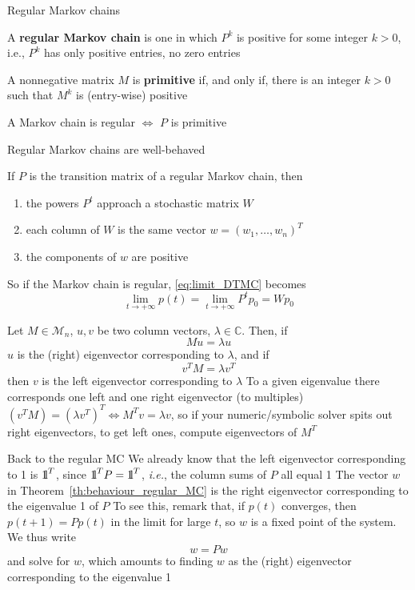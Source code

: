 \documentclass{beamer}
\def\IC{\mathbb{C}}
\def\M{\mathcal{M}}
\def\ie{\emph{i.e.}}
\def\defword#1{\textbf{#1}}
\def\nbOne{{\mathchoice {\rm 1\mskip-4mu l} {\rm 1\mskip-4mu l}
		{\rm 1\mskip-4.5mu l} {\rm 1\mskip-5mu l}}}
\begin{document}
\begin{frame}{Regular Markov chains}
\begin{definition}
A \defword{regular Markov chain} is one in which $P^k$ is positive for some integer $k>0$, i.e., $P^k$ has only positive entries, no zero entries
\end{definition}
\vfill
\begin{definition}
A nonnegative matrix $M$ is \defword{primitive} if, and only if, there is an integer $k>0$ such that $M^k$ is (entry-wise) positive
\end{definition}
\vfill
\begin{theorem}
A Markov chain is regular $\iff$ $P$ is primitive
\end{theorem}
\end{frame}

\begin{frame}{Regular Markov chains are well-behaved}
\begin{theorem}\label{th:behaviour_regular_MC}
If $P$ is the transition matrix of a regular Markov chain, then
\begin{enumerate}
\item the powers $P^t$ approach a stochastic matrix $W$
\item each column of $W$ is the same vector $w=(w_1,\ldots,w_n)^T$
\item the components of $w$ are positive
\end{enumerate}
\end{theorem}
\vfill
So if the Markov chain is regular, \eqref{eq:limit_DTMC} becomes
\[
\lim_{t\rightarrow +\infty}p(t)=\lim_{t\rightarrow +\infty}P^tp_0
=Wp_0
\]
\end{frame}

\begin{frame} 
Let $M\in\M_n$, $u,v$ be two column vectors, $\lambda\in\IC$. Then, if  
\[
Mu=\lambda u
\]
$u$ is the (right) eigenvector corresponding to $\lambda$, and if
\[
v^TM=\lambda v^T
\]
then $v$ is the left eigenvector corresponding to $\lambda$
\vfill 
To a given eigenvalue there corresponds one left and one right eigenvector (to multiples)
\vfill
$(v^TM)=(\lambda v^T)^T\iff M^Tv=\lambda v$, so if your numeric/symbolic solver spits out right eigenvectors, to get left ones, compute eigenvectors of $M^T$
\end{frame}

\begin{frame}{Back to the regular MC}
We already know that the left eigenvector corresponding to 1 is $\nbOne^T$, since $\nbOne^TP=\nbOne^T$, \ie, the column sums of $P$ all equal 1
\vfill
The vector $w$ in Theorem~\ref{th:behaviour_regular_MC} is the right eigenvector corresponding to the eigenvalue 1 of $P$
\vfill
To see this, remark that, if $p(t)$ converges, then $p(t+1)=Pp(t)$ in the limit for large $t$, so $w$ is a fixed point of the system. We thus write
\[
w=Pw
\]
and solve for $w$, which amounts to finding $w$ as the (right) eigenvector corresponding to the eigenvalue 1
\end{frame}
\end{document}
